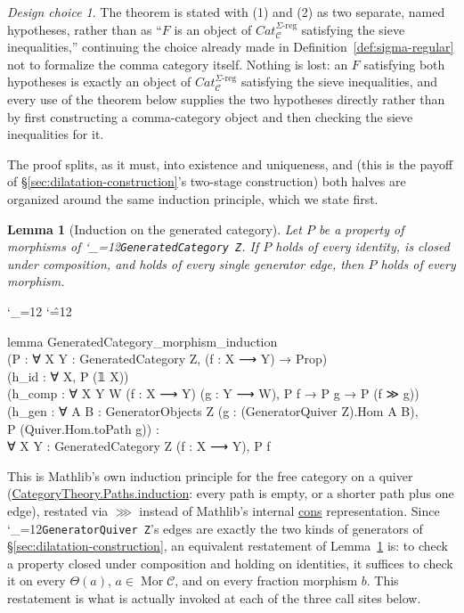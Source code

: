 \documentclass[11pt]{amsart}
\newcommand{\lc}[1]{\url{#1}}
\newcommand{\lcode}{\begingroup\catcode`\_=12\relax\lcodeInner}
\newcommand{\lcodeInner}[1]{\texttt{#1}\endgroup}
\newenvironment{leancode}{%
  \begingroup
  \catcode`\_=12\relax
  \catcode`\^=12\relax
  \small\ttfamily\raggedright\baselineskip=1.15\baselineskip
  \par\smallskip\noindent
}{%
  \par\smallskip
  \endgroup
}
\theoremstyle{plain}
\newtheorem{lemma}[theorem]{Lemma}
\theoremstyle{definition}
\theoremstyle{remark}
\newtheorem*{designchoice}{Design choice}
\newcommand{\calC}{\mathcal C}
\DeclareMathOperator{\Mor}{Mor}
\begin{document}
\begin{designchoice}
The theorem is stated with (1) and (2) as two separate, named hypotheses, rather than as
``$F$ is an object of $Cat_\calC^{\Sigma\text{-reg}}$ satisfying the sieve inequalities,''
continuing the choice already made in Definition~\ref{def:sigma-regular} not to formalize
the comma category itself. Nothing is lost: an $F$ satisfying both hypotheses is exactly an
object of $Cat_\calC^{\Sigma\text{-reg}}$ satisfying the sieve inequalities, and every use of
the theorem below supplies the two hypotheses directly rather than by first constructing a
comma-category object and then checking the sieve inequalities for it.
\end{designchoice}

The proof splits, as it must, into existence and uniqueness, and (this is the payoff of
\S\ref{sec:dilatation-construction}'s two-stage construction) both halves are organized
around the same induction principle, which we state first.

\begin{lemma}[Induction on the generated category]
\label{lem:induction}
Let $P$ be a property of morphisms of \lcode{GeneratedCategory Z}. If $P$ holds of every
identity, is closed under composition, and holds of every single generator edge, then $P$
holds of every morphism.
\end{lemma}

\begin{leancode}
lemma GeneratedCategory_morphism_induction \\
    (P : ∀ {X Y : GeneratedCategory Z}, (f : X ⟶ Y) → Prop) \\
    (h_id : ∀ X, P (𝟙 X)) \\
    (h_comp : ∀ {X Y W} (f : X ⟶ Y) (g : Y ⟶ W), P f → P g → P (f ≫ g)) \\
    (h_gen : ∀ {A B : GeneratorObjects Z} (g : (GeneratorQuiver Z).Hom A B), \\
      P (Quiver.Hom.toPath g)) : \\
    ∀ {X Y : GeneratedCategory Z} (f : X ⟶ Y), P f \\
\end{leancode}
This is Mathlib's own induction principle for the free category on a quiver
(\lc{CategoryTheory.Paths.induction}: every path is empty, or a shorter path plus one edge),
restated via $\ggg$ instead of Mathlib's internal \lc{cons} representation. Since
\lcode{GeneratorQuiver Z}'s edges are exactly the two kinds of generators of
\S\ref{sec:dilatation-construction}, an equivalent restatement of Lemma~\ref{lem:induction} is:
to check a property closed under composition and holding on identities, it suffices to
check it on every $\Theta(a)$, $a \in \Mor\calC$, and on every fraction morphism $b$. This
restatement is what is actually invoked at each of the three call sites below.
\end{document}
